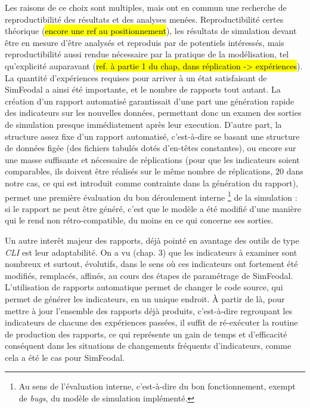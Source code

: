 	Les raisons de ce choix sont multiples, mais ont en commun une recherche de reproductibilité des résultats et des analyses menées.
	Reproductibilité certes théorique (\hl{encore une ref au positionnement}), les résultats de simulation devant être en mesure d'être analysés et reproduis par de potentiels intéressés, mais reproductibilité aussi rendue nécessaire par la pratique de la modélisation, tel qu'explicité auparavant (\hl{ref. à partie 1 du chap, dans réplication -> expériences}).
	La quantité d'expériences requises pour arriver à un état satisfaisant de SimFeodal a ainsi été importante, et le nombre de rapports tout autant.
	La création d'un rapport automatisé garantissait d'une part une génération rapide des indicateurs sur les nouvelles données, permettant donc un examen des sorties de simulation presque immédiatement après leur execution.
	D'autre part, la structure assez fixe d'un rapport automatisé, c'est-à-dire se basant une structure de données figée (des fichiers tabulés dotés d'en-têtes constantes), ou encore sur une masse suffisante et nécessaire de réplications (pour que les indicateurs soient comparables, ils doivent être réalisés sur le même nombre de réplications, $20$ dans notre cas, ce qui est introduit comme contrainte dans la génération du rapport), permet une première évaluation du bon déroulement \og interne \fg{}\footnote{
	Au sens de l'évaluation interne, c'est-à-dire du bon fonctionnement, exempt de \textit{bugs}, du modèle de simulation implémenté.
	} de la simulation : si le rapport ne peut être généré, c'est que le modèle a été modifié d'une manière qui le rend non rétro-compatible, du moins en ce qui concerne ses sorties.

	Un autre interêt majeur des rapports, déjà pointé en avantage des outils de type \textit{CLI} est leur adaptabilité.
	On a vu (chap. 3) que les indicateurs à examiner sont nombreux et surtout, évolutifs, dans le sens où ces indicateurs ont fortement été modifiés, remplacés, affinés, au cours des étapes de paramétrage de SimFeodal.
	L'utilisation de rapports automatique permet de changer le code source, qui permet de générer les indicateurs, en un unique endroit.
	À partir de là, pour mettre à jour l'ensemble des rapports déjà produits, c'est-à-dire regroupant les indicateurs de chacune des expériences passées, il suffit de ré-exécuter la routine de production des rapports, ce qui représente un gain de temps et d'efficacité conséquent dans les situations de changements fréquents d'indicateurs, comme cela a été le cas pour SimFeodal.
	
